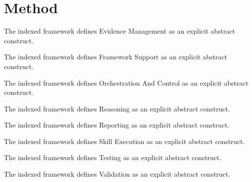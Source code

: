 \section{Method}

The indexed framework defines Evidence Management as an explicit abstract construct.

The indexed framework defines Framework Support as an explicit abstract construct.

The indexed framework defines Orchestration And Control as an explicit abstract construct.

The indexed framework defines Reasoning as an explicit abstract construct.

The indexed framework defines Reporting as an explicit abstract construct.

The indexed framework defines Skill Execution as an explicit abstract construct.

The indexed framework defines Testing as an explicit abstract construct.

The indexed framework defines Validation as an explicit abstract construct.
